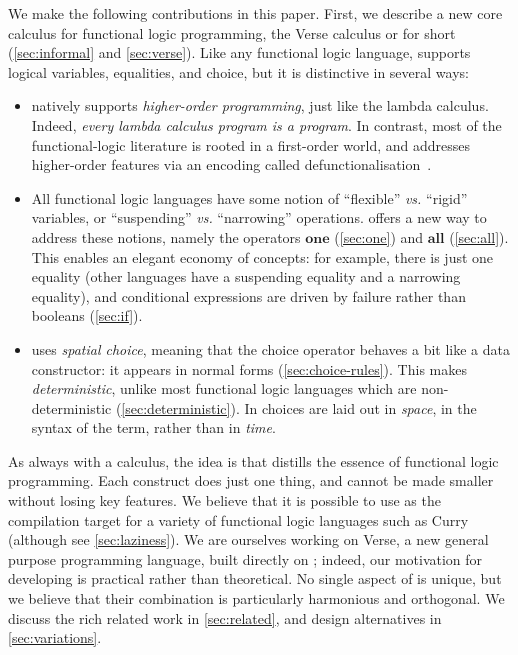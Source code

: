 \documentclass[acmsmall,review,anonymous,dvipsnames]{acmart}
\newcommand{\vs}{\emph{vs.}}
\begin{document}
We make the following contributions in this paper.
First, we describe a new core calculus for functional logic programming,
the Verse calculus or \versecalc{} for short
(\cref{sec:informal} and \ref{sec:verse}).
Like any functional logic language,
\versecalc{} supports logical variables, equalities, and choice, but it is distinctive in several ways:
\begin{itemize}
\item \versecalc{} natively supports \emph{higher-order programming}, just like the lambda calculus.
  Indeed, \emph{every lambda calculus program is a \versecalc{} program}.
  In contrast, most of the functional-logic literature is rooted in a first-order world, and
  addresses higher-order features via an encoding called defunctionalisation~\cite[3.3]{hanus:survey}.
\item All functional logic languages have some notion of ``flexible'' {\vs} ``rigid'' variables,
  or ``suspending'' {\vs} ``narrowing'' operations.  \versecalc{} offers a new
  way to address these notions, namely the operators \ensuremath{\textbf{one}} (\cref{sec:one})
  and \ensuremath{\textbf{all}} (\cref{sec:all}).  This enables an elegant economy of concepts: for example,
  there is just one equality (other languages have a suspending equality and a narrowing equality),
  and conditional expressions are driven by failure rather than booleans (\cref{sec:if}).
\item \versecalc{} uses \emph{spatial choice}, meaning that the choice operator behaves
  a bit like a data constructor: it appears in normal forms (\cref{sec:choice-rules}).
  This makes \versecalc{} \emph{deterministic}, unlike most
  functional logic languages which are non-deterministic (\cref{sec:deterministic}).
  In \versecalc{} choices are laid out in \emph{space},
  in the syntax of the term, rather than in \emph{time}.
\end{itemize}
As always with a calculus, the idea is that \versecalc{} distills the essence of functional logic programming.
Each construct does just one thing, and \versecalc{} cannot be made smaller without losing key features.
We believe that it is possible to use \versecalc{} as the compilation target for a variety of
functional logic languages such as Curry~\cite{hanus:curry-report} (although see \cref{sec:laziness}).
We are ourselves working on Verse, a new general purpose programming language, built directly on \versecalc{}; indeed,
our motivation for developing \versecalc{} is practical rather than theoretical.
No single aspect of \versecalc{} is unique, but we believe that their combination
is particularly harmonious and orthogonal.
We discuss the rich related work in \cref{sec:related}, and design alternatives in \cref{sec:variations}.
\end{document}

